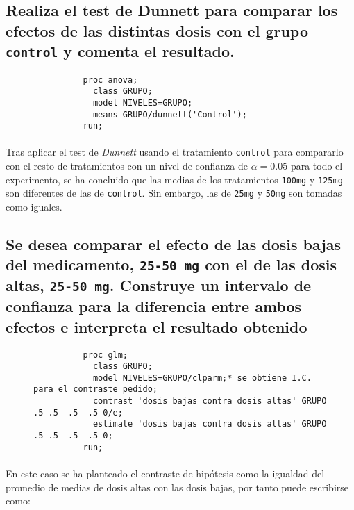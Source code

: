 \documentclass{article}
\begin{document}
    \subsection{Realiza el test de Dunnett para comparar los efectos de las distintas dosis con el grupo \texttt{control} y comenta el resultado.}

      \begin{figure}[h]
        \centering
        \begin{verbatim}
          proc anova;
            class GRUPO;
            model NIVELES=GRUPO;
            means GRUPO/dunnett('Control');
          run;
        \end{verbatim}
        \caption{}
        \label{code:sas_6}
      \end{figure}

      \paragraph{}
      Tras aplicar el test de \emph{Dunnett} usando el tratamiento \texttt{control} para compararlo con el resto de tratamientos con un nivel de confianza de $\alpha=0.05$ para todo el experimento, se ha concluido que las medias de los tratamientos \texttt{100mg} y \texttt{125mg} son diferentes de las de \texttt{control}. Sin embargo, las de \texttt{25mg} y \texttt{50mg} son tomadas como iguales.


    \subsection{Se desea comparar el efecto de las dosis bajas del medicamento, \texttt{25-50 mg} con el de las dosis altas, \texttt{25-50 mg}. Construye un intervalo de confianza para la diferencia entre ambos efectos e interpreta el resultado obtenido}

      \begin{figure}[h]
        \centering
        \begin{verbatim}
          proc glm;
            class GRUPO;
            model NIVELES=GRUPO/clparm;* se obtiene I.C. para el contraste pedido;
            contrast 'dosis bajas contra dosis altas' GRUPO .5 .5 -.5 -.5 0/e;
            estimate 'dosis bajas contra dosis altas' GRUPO .5 .5 -.5 -.5 0;
          run;
        \end{verbatim}
        \caption{}
        \label{code:sas_7}
      \end{figure}

      \paragraph{}
      En este caso se ha planteado el contraste de hipótesis como la igualdad del promedio de medias de dosis altas con las dosis bajas, por tanto puede escribirse como:
\end{document}
